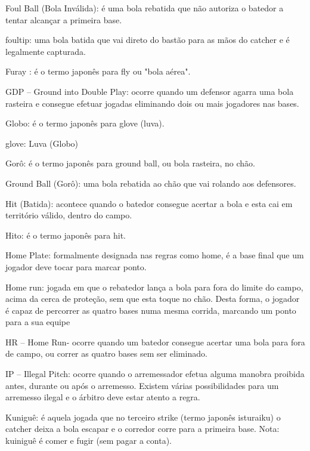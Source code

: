  Foul Ball (Bola Inválida): é uma bola rebatida que não autoriza o batedor a tentar alcançar a primeira base.

 \gls{foultip}: uma bola batida que vai direto do bastão para as mãos do catcher e é legalmente capturada.

 Furay : é o termo japonês para \gls{fly} ou "bola aérea".

 GDP -- Ground into Double Play: ocorre quando um defensor agarra uma bola rasteira e consegue efetuar jogadas eliminando dois ou mais jogadores nas bases.

 Globo: é o termo japonês para \gls{glove} (luva).

 glove: Luva (Globo)

 Gorô: é o termo japonês para \gls{ground} ball, ou bola rasteira, no chão.

 Ground Ball (Gorô): uma bola rebatida ao chão que vai rolando aos defensores.



 Hit (Batida): acontece quando o batedor consegue acertar a bola e esta cai em território válido, dentro do campo.

 Hito: é o termo japonês para \gls{hit}.

 Home Plate: formalmente designada nas regras como \gls{home}, é a base final que um jogador deve tocar para marcar ponto.

 Home run: jogada em que o rebatedor lança a bola para fora do limite do campo, acima da cerca de proteção, sem que esta toque no chão. Desta forma, o jogador é capaz de percorrer as quatro bases numa mesma corrida, marcando um ponto para a sua equipe

 HR -- Home Run- ocorre quando um batedor consegue acertar uma bola para fora de campo, ou correr as quatro bases sem ser eliminado.

 IP -- Illegal Pitch: ocorre quando o arremessador efetua alguma manobra proibida antes, durante ou após o arremesso. Existem várias possibilidades para um arremesso ilegal e o árbitro deve estar atento a regra.


 Kuniguê: é aquela jogada que no terceiro strike (termo japonês isturaiku) o catcher deixa a bola escapar e o corredor corre para a primeira base. Nota: kuiniguê é comer e fugir (sem pagar a conta).

